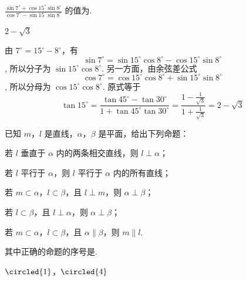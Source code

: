 \documentclass[UTF8,a4paper,oneside,11pt]{ctexbook}
\begin{document}
\begin{problem}
\(\frac{\sin 7^{\circ} + \cos 15^{\circ}\sin 8^{\circ}}{\cos 7^{\circ} - \sin 15^{\circ}\sin 8^{\circ}}\) 的值为\fillinblank{}.
\end{problem}

\begin{answer}
\(2 - \sqrt{3}\)
\end{answer}

\begin{solution}
由 \(7^\circ=15^\circ-8^\circ\)，有
\[
\sin7^\circ=\sin15^\circ\cos8^\circ-\cos15^\circ\sin8^\circ
\],
所以分子为 \(\sin15^\circ\cos8^\circ\). 另一方面，由余弦差公式
\[
\cos7^\circ=\cos15^\circ\cos8^\circ+\sin15^\circ\sin8^\circ
\],
所以分母为 \(\cos15^\circ\cos8^\circ\). 原式等于
\[
\tan15^\circ
=\frac{\tan45^\circ-\tan30^\circ}{1+\tan45^\circ\tan30^\circ}
=\frac{1-\frac1{\sqrt3}}{1+\frac1{\sqrt3}}
=2-\sqrt3
\]
\end{solution}

\begin{problem}
已知 \(m\)，\(l\) 是直线，\(\alpha\)，\(\beta\) 是平面，给出下列命题：
\begin{circlelist}
\item 若 \(l\) 垂直于 \(\alpha\) 内的两条相交直线，则 \(l \perp \alpha\)；
\item 若 \(l\) 平行于 \(\alpha\)，则 \(l\) 平行于 \(\alpha\) 内的所有直线；
\item 若 \(m \subset \alpha\)，\(l \subset \beta\)，且 \(l \perp m\)，则 \(\alpha \perp \beta\)；
\item 若 \(l \subset \beta\)，且 \(l \perp \alpha\)，则 \(\alpha \perp \beta\)；
\item 若 \(m \subset \alpha\)，\(l \subset \beta\)，且 \(\alpha \parallel \beta\)，则 \(m \parallel l\).
\end{circlelist}
其中正确的命题的序号是\fillinblank{}.
\end{problem}

\begin{answer}
\(\circled{1}\)，\(\circled{4}\)
\end{answer}
\end{document}
